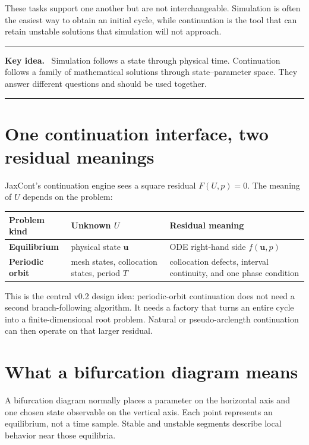 \documentclass[11pt,oneside]{book}
\newcommand{\state}{\bm{u}}
\newenvironment{keyidea}
  {\par\medskip\noindent\begin{minipage}{\textwidth}
   \color{JaxBlue}\rule{\textwidth}{0.8pt}\par
   \textbf{Key idea.}\ \color{black}}
  {\par\color{JaxBlue}\rule{\textwidth}{0.8pt}
   \end{minipage}\par\medskip}
\begin{document}
These tasks support one another but are not interchangeable. Simulation is
often the easiest way to obtain an initial cycle, while continuation is the
tool that can retain unstable solutions that simulation will not approach.

\begin{keyidea}
Simulation follows a state through physical time. Continuation follows a family
of mathematical solutions through state--parameter space. They answer different
questions and should be used together.
\end{keyidea}

\section{One continuation interface, two residual meanings}

JaxCont's continuation engine sees a square residual $F(U,p)=0$. The meaning
of $U$ depends on the problem:

\noindent\begin{tabularx}{\textwidth}{>{\bfseries}p{}p{}X}
\toprule
Problem kind & Unknown $U$ & Residual meaning\\
\midrule
Equilibrium & physical state $\state$ & ODE right-hand side
$f(\state,p)$\\
Periodic orbit & mesh states, collocation states, period $T$ & collocation
defects, interval continuity, and one phase condition\\
\bottomrule
\end{tabularx}

This is the central v0.2 design idea: periodic-orbit continuation does not need
a second branch-following algorithm. It needs a factory that turns an entire
cycle into a finite-dimensional root problem. Natural or pseudo-arclength
continuation can then operate on that larger residual.

\section{What a bifurcation diagram means}

A bifurcation diagram normally places a parameter on the horizontal axis and
one chosen state observable on the vertical axis. Each point represents an
equilibrium, not a time sample. Stable and unstable segments describe local
behavior near those equilibria.

\begin{center}
\end{center}
\end{document}
